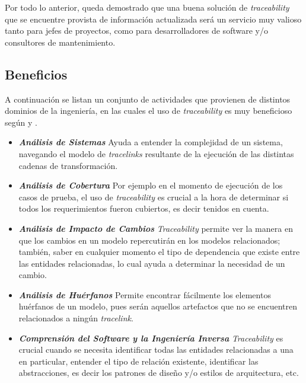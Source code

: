 \documentclass[a4paper,12pt,oneside,spanish]{book}
\begin{document}
Por todo lo anterior, queda demostrado que una buena solución de \textit{traceability} que se encuentre provista de información actualizada será un servicio muy valioso tanto para jefes de proyectos, como para desarrolladores de software y/o consultores de mantenimiento.




\subsection{Beneficios}

A continuación se listan un conjunto de actividades que provienen de distintos dominios de la ingeniería, en las cuales el uso de \textit{traceability} es muy beneficioso según \cite{BrcinaRiebisch} y \cite{GrammelVoigt}.

\begin{itemize}

\item \textit{\textbf{Análisis de Sistemas}} Ayuda a entender la complejidad de un sistema, navegando el modelo de \textit{tracelinks} resultante de la ejecución de las distintas cadenas de transformación.

\item \textit{\textbf{Análisis de Cobertura}} Por ejemplo en el momento de ejecución de los casos de prueba, el uso de \textit{traceability} es crucial a la hora de determinar si todos los requerimientos fueron cubiertos, es decir tenidos en cuenta.

\item \textit{\textbf{Análisis de Impacto de Cambios}} \textit{Traceability} permite ver la manera en que los cambios en un modelo repercutirán en los modelos relacionados; también, saber en cualquier momento el tipo de dependencia que existe entre las entidades relacionadas, lo cual ayuda a determinar la necesidad de un cambio.

\item \textit{\textbf{Análisis de Huérfanos}} Permite encontrar fácilmente los elementos huérfanos de un modelo, pues serán aquellos artefactos que no se encuentren relacionados a ningún \textit{tracelink}.

\item \textit{\textbf{Comprensión del Software y la Ingeniería Inversa}} \textit{Traceability} es crucial cuando se necesita identificar todas las entidades relacionadas a una en particular, entender el tipo de relación existente, identificar las abstracciones, es decir los patrones de diseño y/o estilos de arquitectura, etc.


\end{itemize}
\end{document}
